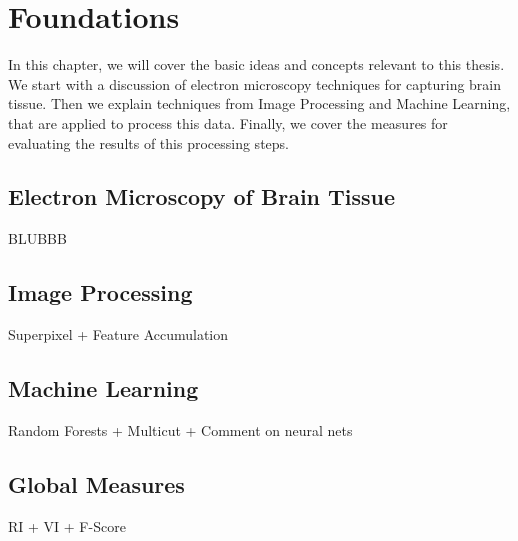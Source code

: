 
\chapter{Foundations} %

\label{Chapter2}

In this chapter, we will cover the basic ideas and concepts relevant to this thesis.
We start with a discussion of electron microscopy techniques for capturing brain tissue.
Then we explain techniques from Image Processing and Machine Learning, that are applied to process this data.
Finally, we cover the measures for evaluating the results of this processing steps.

\section{Electron Microscopy of Brain Tissue}


BLUBBB

\section{Image Processing}

Superpixel + Feature Accumulation


\section{Machine Learning}

Random Forests + Multicut + Comment on neural nets

\section{Global Measures}

RI + VI + F-Score



